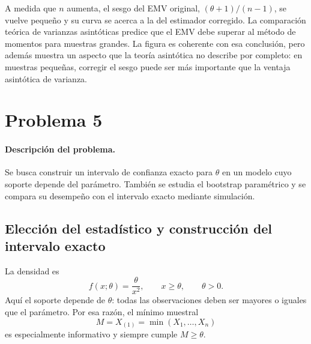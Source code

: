 \documentclass[10pt,a4paper,oneside]{article}
\begin{document}
A medida que $n$ aumenta, el sesgo del EMV original, $(\theta+1)/(n-1)$, se vuelve pequeño y su curva se acerca a la del estimador corregido. La comparación teórica de varianzas asintóticas predice que el EMV debe superar al método de momentos para muestras grandes. La figura es coherente con esa conclusión, pero además muestra un aspecto que la teoría asintótica no describe por completo: en muestras pequeñas, corregir el sesgo puede ser más importante que la ventaja asintótica de varianza.

\section{Problema 5}

\paragraph{Descripción del problema.}
Se busca construir un intervalo de confianza exacto para $\theta$ en un modelo cuyo soporte depende del parámetro. También se estudia el bootstrap paramétrico y se compara su desempeño con el intervalo exacto mediante simulación.

\subsection*{Elección del estadístico y construcción del intervalo exacto}

La densidad es
\begin{equation*}
f(x;\theta)=\frac{\theta}{x^2},
\qquad x\geq\theta,
\qquad\theta>0.
\end{equation*}
Aquí el soporte depende de $\theta$: todas las observaciones deben ser mayores o iguales que el parámetro. Por esa razón, el mínimo muestral
\begin{equation*}
M=X_{(1)}=\min(X_1,\ldots,X_n)
\end{equation*}
es especialmente informativo y siempre cumple $M\geq\theta$.
\end{document}
